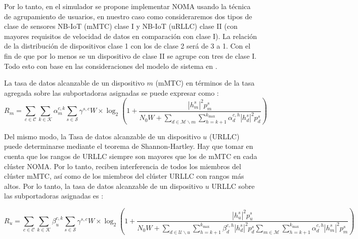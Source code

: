 Por lo tanto, en el simulador se propone implementar NOMA usando la técnica de agrupamiento de usuarios, en nuestro caso como consideraremos dos tipos de clase de sensores NB-IoT (mMTC) clase I y NB-IoT (uRLLC) clase II (con mayores requisitos de velocidad de datos en comparación con clase I). La relación de la distribución de dispositivos clase 1 con los de clase 2 será de 3 a 1. Con el fin de que por lo menos se un dispositivo de clase II se agrupe con tres de clase I. Todo esto con base en las consideraciones del modelo de sistema en \parencite{Shahini2019}.

La tasa de datos alcanzable de un dispositivo $m$ (mMTC) en términos de la tasa agregada sobre las subportadoras asignadas se puede expresar como \parencite{Shahini2019}:
\begin{equation}
{R_{m}}=\sum \limits _{c \in \mathcal {C}} {\sum \limits _{k \in \mathcal {K}} {\alpha _{m}^{c,k}\sum \limits _{s \in \mathcal {S}} {{\gamma ^{s,c}}W} } } \times {\log _{2}}\left ({{1 + \frac {{{{\left |{ {h_{m}^{s}} }\right |}^{2}}p_{m}^{s}}}{{N_{0}W + \sum \limits _{d \in \mathcal {M}\backslash m} {\sum \limits _{h = k + 1}^{{k_{\max }}} {\alpha _{d}^{c,h}{{\left |{ {h_{d}^{s}} }\right |}^{2}}p_{d}^{s}} } }}} }\right)
\label{eqn:Rm}
\end{equation}

Del mismo modo, la Tasa de datos alcanzable de un dispositivo $u$ (URLLC) puede determinarse mediante el teorema de Shannon-Hartley. Hay que tomar en cuenta que los rangos de URLLC siempre son mayores que los de mMTC en cada clúster NOMA. Por lo tanto, reciben interferencia de todos los miembros del clúster mMTC, así como de los miembros del clúster URLLC con rangos más altos. 
Por lo tanto, la tasa de datos alcanzable de un dispositivo $u$ URLLC sobre las subportadoras asignadas es \parencite{Shahini2019}:

\begin{equation}
{R_{u}}=\sum \limits _{c \in \mathcal {C}} {\sum \limits _{k \in \mathcal {K}} {\beta _{u}^{c,k}\sum \limits _{s \in \mathcal {S}} {{\gamma ^{s,c}}W} } } \times {\log _{2}}\left ({{1 + \frac {{{{\left |{ {h_{u}^{s}} }\right |}^{2}}p_{u}^{s}}}{{N_{0}W + \sum \limits _{d \in \mathcal {U}\backslash u} {\sum \limits _{h = k + 1}^{{k_{\max }}} {\beta _{d}^{c,h}{{\left |{ {h_{d}^{s}} }\right |}^{2}}p_{d}^{s}}} \sum \limits _{m \in \mathcal {M}} {\sum \limits _{h = k + 1}^{{k_{\max }}} {\alpha _{d}^{c,h}{{\left |{ {h_{m}^{s}} }\right |}^{2}}p_{m}^{s}} } }}} }\right)
\label{eqn:Ru}
\end{equation}



